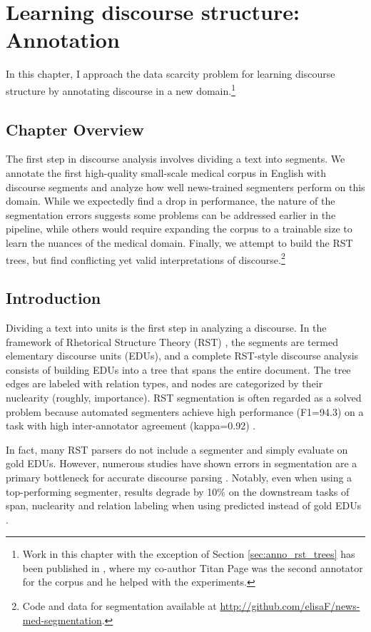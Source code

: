 \chapter{Learning discourse structure: Annotation}
\label{ch:annotation}
In this chapter, I approach the data scarcity problem for learning discourse structure by annotating discourse in a new domain.\footnote{Work in this chapter with the exception of Section \ref{sec:anno_rst_trees} has been published in , where my co-author Titan Page was the second annotator for the corpus and he helped with the experiments.}

\section{Chapter Overview}

The first step in discourse analysis involves dividing a text into segments. We annotate the first high-quality small-scale medical corpus in English with discourse segments and analyze how well news-trained segmenters perform on this domain. While we expectedly find a drop in performance, the nature of the segmentation errors suggests some problems can be addressed earlier in the pipeline, while others would require expanding the corpus to a trainable size to learn the nuances of the medical domain. Finally, we attempt to build the RST trees, but find conflicting yet valid interpretations of discourse.\footnote{Code and data for segmentation available at \url{http://github.com/elisaF/news-med-segmentation}.}

\section{Introduction}

Dividing a text into units is the first step in analyzing a discourse. In the framework of Rhetorical Structure Theory (RST) \cite{Mann:1988}, the segments are termed elementary discourse units (EDUs), and a complete RST-style discourse analysis consists of building EDUs into a tree that spans the entire document. The tree edges are labeled with relation types, and nodes are categorized by their nuclearity (roughly, importance). RST segmentation is often regarded as a solved problem because automated segmenters achieve high performance (F1=94.3) on a task with high inter-annotator agreement (kappa=0.92) \cite{Wang:2018,Carlson:2001}.

In fact, many RST parsers do not include a segmenter and simply evaluate on gold EDUs. However, numerous studies have shown errors in segmentation are a primary bottleneck for accurate discourse parsing \cite{Soricut:2003,Fisher:2007,Joty:2015,Feng:2015}. Notably, even when using a top-performing segmenter, results degrade by 10\% on the downstream tasks of span, nuclearity and relation labeling when using predicted instead of gold EDUs \cite{Feng:2015}.

